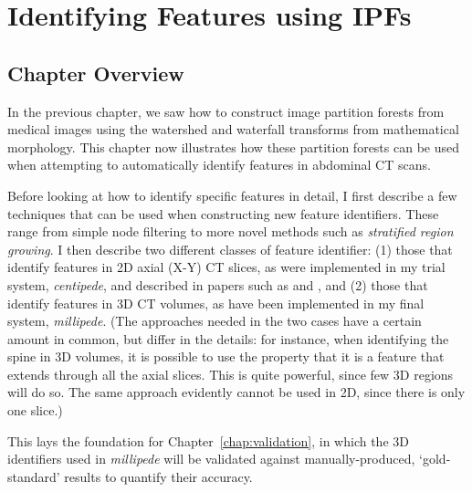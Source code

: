 \chapter{Identifying Features using IPFs}
\label{chap:featureid}

\section{Chapter Overview}

In the previous chapter, we saw how to construct image partition forests from medical images using the watershed and waterfall transforms from mathematical morphology. This chapter now illustrates how these partition forests can be used when attempting to automatically identify features in abdominal CT scans.

Before looking at how to identify specific features in detail, I first describe a few techniques that can be used when constructing new feature identifiers. These range from simple node filtering to more novel methods such as \emph{stratified region growing}. I then describe two different classes of feature identifier: (1) those that identify features in 2D axial (X-Y) CT slices, as were implemented in my trial system, \emph{centipede}, and described in papers such as \cite{gvccimi08} and \cite{gvcispa09}, and (2) those that identify features in 3D CT volumes, as have been implemented in my final system, \emph{millipede}. (The approaches needed in the two cases have a certain amount in common, but differ in the details: for instance, when identifying the spine in 3D volumes, it is possible to use the property that it is a feature that extends through all the axial slices. This is quite powerful, since few 3D regions will do so. The same approach evidently cannot be used in 2D, since there is only one slice.)

This lays the foundation for Chapter~\ref{chap:validation}, in which the 3D identifiers used in \emph{millipede} will be validated against manually-produced, `gold-standard' results to quantify their accuracy.


